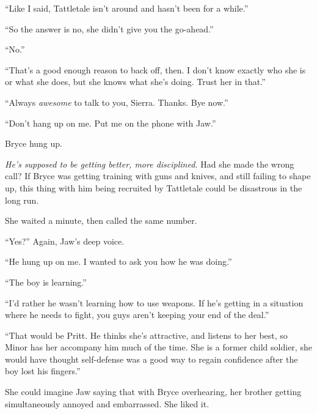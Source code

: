 ``Like I said, Tattletale isn't around and hasn't been for a while.''



``So the answer is no, she didn't give you the go-ahead.''



``No.''



``That's a good enough reason to back off, then.  I don't know exactly who she is or what she does, but she knows what she's doing.  Trust her in that.''



``Always \emph{awesome} to talk to you, Sierra.  Thanks.  Bye now.''



``Don't hang up on me.  Put me on the phone with Jaw.''



Bryce hung up.



\emph{He's supposed to be getting better, more disciplined.}  Had she made the wrong call?  If Bryce was getting training with guns and knives, and still failing to shape up, this thing with him being recruited by Tattletale could be disastrous in the long run.



She waited a minute, then called the same number.



``Yes?''  Again, Jaw's deep voice.



``He hung up on me.  I wanted to ask you how he was doing.''



``The boy is learning.''



``I'd rather he wasn't learning how to use weapons.  If he's getting in a situation where he needs to fight, you guys aren't keeping your end of the deal.''



``That would be Pritt.  He thinks she's attractive, and listens to her best, so Minor has her accompany him much of the time.  She is a former child soldier, she would have thought self-defense was a good way to regain confidence after the boy lost his fingers.''



She could imagine Jaw saying that with Bryce overhearing, her brother getting simultaneously annoyed and embarrassed.  She liked it.



